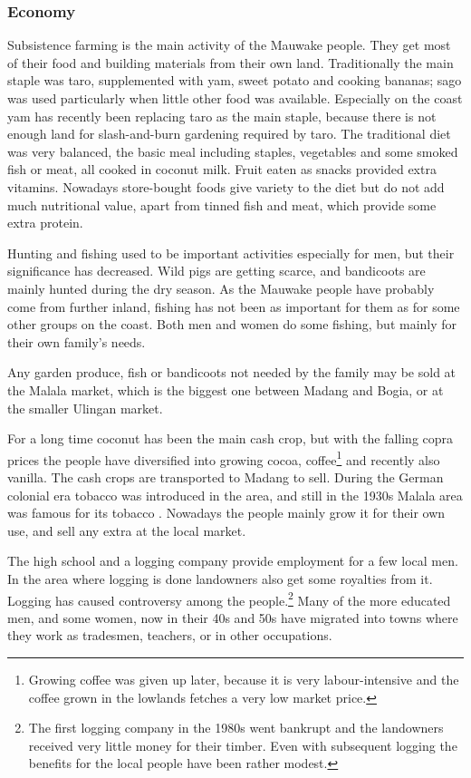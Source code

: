 \subsubsection{Economy}
Subsistence farming is the main activity of the Mauwake people. They get most of their food and building materials from their own land.  Traditionally the main staple was taro, supplemented with yam, sweet potato and cooking bananas; sago was used particularly when little other food was available. Especially on the coast yam has recently been replacing taro as the main staple, because there is not enough land for slash-and-burn gardening required by taro. The traditional diet was very balanced, the basic meal including staples, vegetables and some smoked fish or meat, all cooked in coconut milk. Fruit eaten as snacks provided extra vitamins. Nowadays store-bought foods give variety to the diet but do not add much nutritional value, apart from tinned fish and meat, which provide some extra protein.

Hunting and fishing used to be important activities especially for men, but their significance has decreased. Wild pigs are getting scarce, and bandicoots are mainly hunted during the dry season.  As the Mauwake people have probably come from further inland, fishing has not been as important for them as for some other groups on the coast.  Both men and women do some fishing, but mainly for their own family's needs. 

Any garden produce, fish or bandicoots not needed by the family may be sold at the Malala market, which is the biggest one between Madang and Bogia, or at the smaller Ulingan market.  

For a long time coconut has been the main cash crop, but with the falling copra prices the people have diversified into growing cocoa, coffee\footnote{Growing coffee was given up later, because it is very labour-intensive and the  coffee grown in the lowlands fetches a very low market price.} and recently also vanilla.  The cash crops are transported to Madang to sell.  During the German colonial era tobacco was introduced in the area, and still in the 1930s Malala area was famous for its tobacco \citep[454]{Tranel1952}. Nowadays the people mainly grow it for their own use, and sell any extra at the local market.

The high school and a logging company provide employment for a few local men.  In the area where logging is done landowners also get some royalties from it.  Logging has caused controversy among the people.\footnote{The first logging company in the 1980s went bankrupt and the landowners received very little money for their timber.  Even with subsequent logging the benefits for the local people have been rather modest.} Many of the more educated men, and some women, now in their 40s and 50s have migrated into towns where they work as tradesmen, teachers, or in other occupations. 

